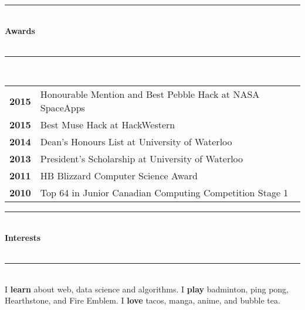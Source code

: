 \documentclass[10pt]{article}
\newcommand{\cvsectiontitle}[1]{%
	\rule{\linewidth}{0.2mm}\\%
		{\large\indent\textbf{#1}}\\%
	\\[-6.5mm]\rule{\linewidth}{0.2mm}\\[2mm]%
	}
\newcommand{\cvaward}[2]{\textbf{#1} & {#2}}
\begin{document}
\vspace{-2.5mm}
\cvsectiontitle{Awards}
\begin{tabular}{ c l }
	\cvaward{2015}{Honourable Mention and Best Pebble Hack at NASA SpaceApps} \\
	\cvaward{2015}{Best Muse Hack at HackWestern} \\
	\cvaward{2014}{Dean's Honours List at University of Waterloo} \\
	\cvaward{2013}{President's Scholarship at University of Waterloo} \\
	\cvaward{2011}{HB Blizzard Computer Science Award} \\
	\cvaward{2010}{Top 64 in Junior Canadian Computing Competition Stage 1}
\end{tabular}

\vspace{2mm}
\cvsectiontitle{Interests}
I \textbf{learn} about web, data science and algorithms.
I \textbf{play} badminton, ping pong, Hearthstone, and Fire Emblem.
I \textbf{love} tacos, manga, anime, and bubble tea.
\end{document}

